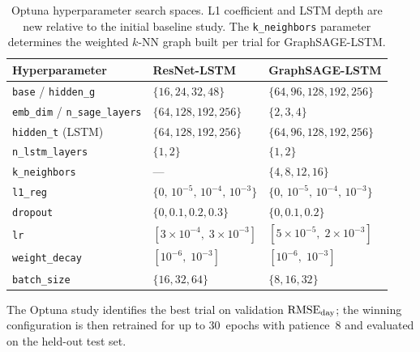 \begin{table}[t]
  \centering
  \caption{Optuna hyperparameter search spaces. L1 coefficient and LSTM depth are
           new relative to the initial baseline study. The \texttt{k\_neighbors}
           parameter determines the weighted $k$-NN graph built per trial for
           GraphSAGE-LSTM.}
  \label{tab:hpspace}
  \setlength{\tabcolsep}{5pt}
  \begin{tabular}{lll}
    \toprule
    \textbf{Hyperparameter} & \textbf{ResNet-LSTM} & \textbf{GraphSAGE-LSTM} \\
    \midrule
    \texttt{base} / \texttt{hidden\_g}           & $\{16,24,32,48\}$                     & $\{64,96,128,192,256\}$               \\
    \texttt{emb\_dim} / \texttt{n\_sage\_layers} & $\{64,128,192,256\}$                  & $\{2,3,4\}$                           \\
    \texttt{hidden\_t} (LSTM)                    & $\{64,128,192,256\}$                  & $\{64,96,128,192,256\}$               \\
    \texttt{n\_lstm\_layers}                     & $\{1,2\}$                             & $\{1,2\}$                             \\
    \texttt{k\_neighbors}                        & ---                                   & $\{4,8,12,16\}$                       \\
    \texttt{l1\_reg}                             & $\{0,\,10^{-5},\,10^{-4},\,10^{-3}\}$& $\{0,\,10^{-5},\,10^{-4},\,10^{-3}\}$\\
    \texttt{dropout}                             & $\{0,0.1,0.2,0.3\}$                  & $\{0,0.1,0.2\}$                       \\
    \texttt{lr}                                  & $[3{\times}10^{-4},\;3{\times}10^{-3}]$ & $[5{\times}10^{-5},\;2{\times}10^{-3}]$ \\
    \texttt{weight\_decay}                       & $[10^{-6},\;10^{-3}]$                & $[10^{-6},\;10^{-3}]$                 \\
    \texttt{batch\_size}                         & $\{16,32,64\}$                        & $\{8,16,32\}$                         \\
    \bottomrule
  \end{tabular}
\end{table}

The Optuna study identifies the best trial on validation $\text{RMSE}_\text{day}$; the winning
configuration is then retrained for up to 30~epochs with patience~8 and evaluated
on the held-out test set.


